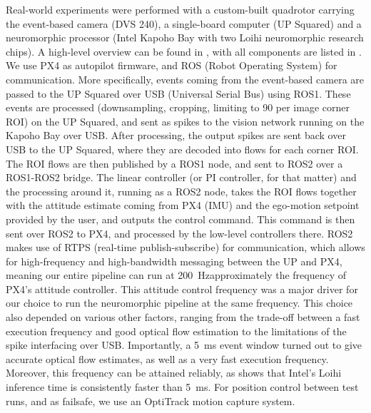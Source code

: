 Real-world experiments were performed with a custom-built quadrotor carrying the event-based camera (DVS 240), a single-board computer (UP Squared) and a neuromorphic processor (Intel Kapoho Bay with two Loihi neuromorphic research chips). A high-level overview can be found in , with all components are listed in . We use PX4 as autopilot firmware, and ROS (Robot Operating System) for communication. More specifically, events coming from the event-based camera are passed to the UP Squared over USB (Universal Serial Bus) using ROS1. These events are processed (downsampling, cropping, limiting to 90 per image corner ROI) on the UP Squared, and sent as spikes to the vision network running on the Kapoho Bay over USB. After processing, the output spikes are sent back over USB to the UP Squared, where they are decoded into flows for each corner ROI. The ROI flows are then published by a ROS1 node, and sent to ROS2 over a ROS1-ROS2 bridge. The linear controller (or PI controller, for that matter) and the processing around it, running as a ROS2 node, takes the ROI flows together with the attitude estimate coming from PX4 (IMU) and the ego-motion setpoint provided by the user, and outputs the control command. This command is then sent over ROS2 to PX4, and processed by the low-level controllers there. ROS2 makes use of RTPS (real-time publish-subscribe) for communication, which allows for high-frequency and high-bandwidth messaging between the UP and PX4, meaning our entire pipeline can run at 200~Hz\textemdash approximately the frequency of PX4's attitude controller. This attitude control frequency was a major driver for our choice to run the neuromorphic pipeline at the same frequency. This choice also depended on various other factors, ranging from the trade-off between a fast execution frequency and good optical flow estimation to the limitations of the spike interfacing over USB. Importantly, a 5~ms event window turned out to give accurate optical flow estimates, as well as a very fast execution frequency. Moreover, this frequency can be attained reliably, as  shows that Intel's Loihi inference time is consistently faster than 5~ms. For position control between test runs, and as failsafe, we use an OptiTrack motion capture system.


